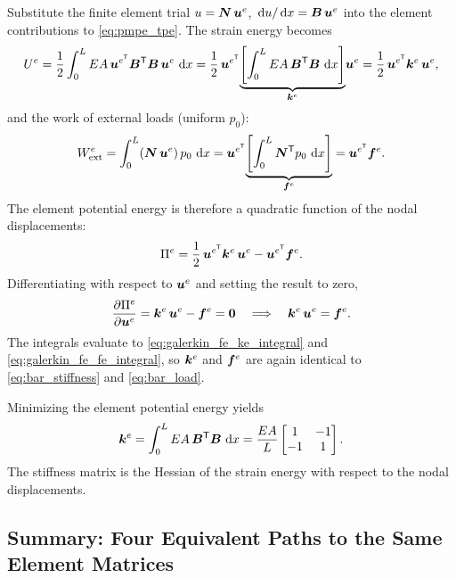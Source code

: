 Substitute the finite element trial $u = \bm{N}\,\bm{u}^e$,
$\,\mathrm{d} u/\,\mathrm{d} x = \bm{B}\,\bm{u}^e$ into the element contributions to
\cref{eq:pmpe_tpe}. The strain energy becomes
\[
    U^e = \frac{1}{2}\int_0^L EA\,\bm{u}^{e^{\mathsf{T}}}\bm{B}^{\mathsf{T}}\bm{B}\,\bm{u}^e\,\,\mathrm{d} x
        = \frac{1}{2}\,\bm{u}^{e^{\mathsf{T}}}
          \!\underbrace{\left[\int_0^L EA\,\bm{B}^{\mathsf{T}}\bm{B}\,\,\mathrm{d} x\right]}_{\bm{k}^e}
          \!\bm{u}^e
        = \frac{1}{2}\,\bm{u}^{e^{\mathsf{T}}}\bm{k}^e\,\bm{u}^e ,
\]
and the work of external loads (uniform $p_0$):
\[
    W_{\mathrm{ext}}^e = \int_0^L (\bm{N}\,\bm{u}^e)\,p_0\,\,\mathrm{d} x
        = \bm{u}^{e^{\mathsf{T}}}
          \!\underbrace{\left[\int_0^L \bm{N}^{\mathsf{T}} p_0\,\,\mathrm{d} x\right]}_{\bm{f}^e}
        = \bm{u}^{e^{\mathsf{T}}}\bm{f}^e .
\]
The element potential energy is therefore a quadratic function of the nodal
displacements:
\begin{equation}
    \Pi^e = \frac{1}{2}\,\bm{u}^{e^{\mathsf{T}}}\bm{k}^e\,\bm{u}^e
            - \bm{u}^{e^{\mathsf{T}}}\bm{f}^e .
    \label{eq:pmpe_tpe_element}
\end{equation}
Differentiating with respect to $\bm{u}^e$ and setting the result to zero,
\begin{equation}
    \frac{\partial\Pi^e}{\partial\bm{u}^e}
    = \bm{k}^e\,\bm{u}^e - \bm{f}^e = \bm{0}
    \quad\Longrightarrow\quad
    \bm{k}^e\,\bm{u}^e = \bm{f}^e .
    \label{eq:pmpe_stationarity_result}
\end{equation}
The integrals evaluate to \cref{eq:galerkin_fe_ke_integral} and
\cref{eq:galerkin_fe_fe_integral}, so $\bm{k}^e$ and $\bm{f}^e$ are again
identical to \cref{eq:bar_stiffness} and \cref{eq:bar_load}.

\begin{importantbox}
Minimizing the element potential energy yields
\[
    \bm{k}^e
    = \int_0^L EA\,\bm{B}^{\mathsf{T}}\bm{B}\,\,\mathrm{d} x
    = \frac{EA}{L}\begin{bmatrix}1&-1\\-1&1\end{bmatrix} .
\]
The stiffness matrix is the Hessian of the strain energy with respect to the
nodal displacements.
\end{importantbox}

\subsection{Summary: Four Equivalent Paths to the Same Element Matrices}
\label{sec:pmpe_summary}

